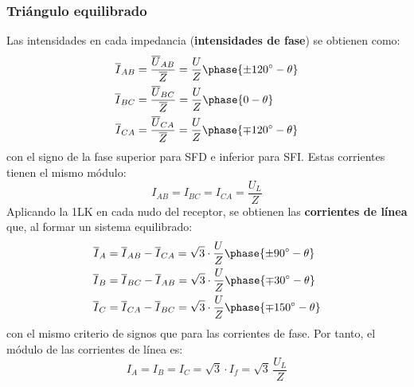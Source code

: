 	\subsubsection{Triángulo equilibrado}
	Las intensidades en cada impedancia (\textbf{intensidades de fase}) se obtienen como: 
	\begin{align*}
          \overline{I}_{AB} &= \frac{\overline{U}_{AB}}{\overline{Z}} = \frac{U}{Z}\phase{{\pm 120^\circ} - \theta} \\
          \overline{I}_{BC} &= \frac{\overline{U}_{BC}}{\overline{Z}} = \frac{U}{Z}\phase{0 - \theta}\\
          \overline{I}_{CA} &= \frac{\overline{U}_{CA}}{\overline{Z}} = \frac{U}{Z}\phase{{\mp 120^\circ} - \theta}
    \end{align*}
    con el signo de la fase superior para SFD e inferior para SFI. Estas corrientes tienen el mismo módulo: 
    \begin{equation}
        \boxed{{I_{AB}}={I_{BC}}={I_{CA}} = \dfrac{U_L}{Z}}
    \end{equation}
    Aplicando la 1LK en cada nudo del receptor, se obtienen las \textbf{corrientes de línea} que, al formar un sistema equilibrado: 
    \begin{align}
      \overline{I}_A &= \overline{I}_{AB} - \overline{I}_{CA} = \sqrt{3} \cdot \frac{U}{Z}\phase{{\pm 90^\circ} - \theta}\\
      \overline{I}_B &= \overline{I}_{BC} - \overline{I}_{AB} = \sqrt{3} \cdot \frac{U}{Z}\phase{{\mp 30^\circ} - \theta}\\
      \overline{I}_C &= \overline{I}_{CA} - \overline{I}_{BC} = \sqrt{3} \cdot \frac{U}{Z}\phase{{\mp 150^\circ} - \theta}
    \end{align}
    con el mismo criterio de signos que para las corrientes de fase. Por tanto, el módulo de las corrientes de línea es: 
    \begin{equation}
        \boxed{{I}_A = {I}_B = {I}_C = \sqrt{3} \cdot I_f = \sqrt{3}\,\frac{U_L}{Z}}
    \end{equation}
	
